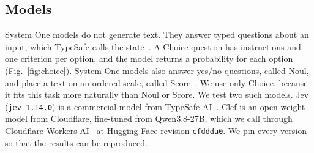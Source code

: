 \documentclass[sigconf]{acmart}
\begin{document}


\subsection{Models}
System One models do not generate text. They answer typed questions about an input, which TypeSafe calls the state~\cite{typesafe2026jev,deusser2026jev}. A Choice question has instructions and one criterion per option, and the model returns a probability for each option (Fig.~\ref{fig:choice}). System One models also answer yes/no questions, called Noul, and place a text on an ordered scale, called Score~\cite{typesafe2026jev}. We use only Choice, because it fits this task more naturally than Noul or Score. We test two such models. Jev (\texttt{jev-1.14.0}) is a commercial model from TypeSafe AI~\cite{typesafe2026jev}. Clef is an open-weight model from Cloudflare, fine-tuned from Qwen3.8-27B, which we call through Cloudflare Workers AI~\cite{cloudflare2026clef} at Hugging Face revision \texttt{cfddda0}. We pin every version so that the results can be reproduced.
\end{document}
